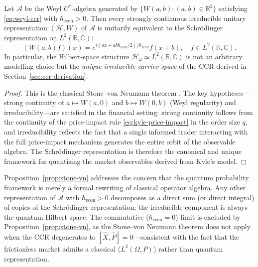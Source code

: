 \begin{proposition}
\label{prop:stone-vn}
Let $\mathcal{A}$ be the Weyl $C^*$-algebra generated by
$\{W(a,b): (a,b)\in\mathbb{R}^2\}$ satisfying \eqref{eq:weyl-ccr} with
$\hbar_{\mathrm{econ}} > 0$. Then every strongly continuous irreducible
unitary representation $(\mathcal{H}, W)$ of $\mathcal{A}$ is unitarily
equivalent to the Schr\"{o}dinger representation on $L^2(\mathbb{R},\mathbb{C})$:
\begin{equation*}
    (W(a,b)f)(x) = e^{i(ax + ab\hbar_{\mathrm{econ}}/2)/\hbar_{\mathrm{econ}}}
    f\!\left(x + b\right), \quad f \in L^2(\mathbb{R},\mathbb{C}).
\end{equation*}
In particular, the Hilbert-space structure $\mathcal{H}_\omega \simeq
L^2(\mathbb{R},\mathbb{C})$ is not an arbitrary modelling choice but the
\emph{unique irreducible carrier space} of the CCR derived in
Section~\ref{sec:ccr-derivation}.
\end{proposition}

\begin{proof}
This is the classical Stone--von Neumann theorem
\citep{vonNeumann1931,reed1972methods}. The key hypotheses---strong continuity
of $a \mapsto W(a,0)$ and $b \mapsto W(0,b)$ (Weyl regularity) and
irreducibility---are satisfied in the financial setting: strong continuity
follows from the continuity of the price-impact rule \eqref{eq:kyle-price-impact}
in the order size $q$, and irreducibility reflects the fact that a single
informed trader interacting with the full price-impact mechanism generates
the entire orbit of the observable algebra. The Schr\"{o}dinger representation
is therefore the canonical and unique framework for quantising the market
observables derived from Kyle's model.
\end{proof}

\begin{remark}
Proposition~\ref{prop:stone-vn} addresses the concern that the quantum
probability framework is merely a formal rewriting of classical operator
algebra. Any other representation of $\mathcal{A}$ with $\hbar_{\mathrm{econ}}>0$
decomposes as a direct sum (or direct integral) of copies of the Schr\"{o}dinger
representation; the irreducible component is always the quantum Hilbert space.
The commutative ($\hbar_{\mathrm{econ}} = 0$) limit is excluded by
Proposition~\ref{prop:stone-vn}, as the Stone--von Neumann theorem does not apply
when the CCR degenerates to $[\hat{X},\hat{P}]=0$---consistent with the fact
that the frictionless market admits a classical ($L^2(\Omega,P)$) rather than
quantum representation.
\end{remark}
